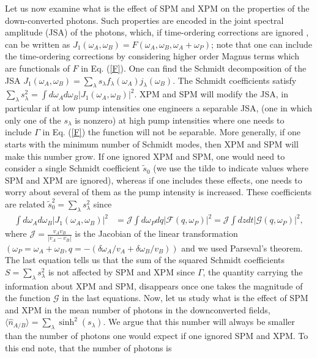 \documentclass[letterpaper,10pt]{article}
\newcommand{\braket}[1]{\langle #1 \rangle}
\newcommand{\eq}[1]{\begin{align}#1\end{align}}
\begin{document}
Let us now examine what is the effect of SPM and XPM on the properties of the down-converted photons. Such properties are encoded in the joint spectral amplitude (JSA) of the photons, which, if time-ordering corrections are ignored \cite{nico1}, can be written as $J_1(\omega_A,\omega_B)=F(\omega_A,\omega_B,\omega_A+\omega_P)$; note that one can include the time-ordering corrections by considering higher order Magnus terms \cite{nico2} which are functionals of $F$ in Eq. (\ref{F}).
One can find the Schmidt decomposition of the JSA $J_1(\omega_A,\omega_B)=\sum_\lambda s_\lambda f_\lambda (\omega_A) j_\lambda(\omega_B)$. 
The Schmidt coefficients satisfy $\sum_\lambda s_\lambda^2=\int d \omega_A d\omega_B |J_1(\omega_A,\omega_B)|^2$. 
XPM and SPM will modify the JSA, in particular if at low pump intensities one engineers a separable JSA, (one in which only one of the $s_\lambda$ is nonzero) at high pump intensities where one needs to include $\Gamma$ in Eq. (\ref{F}) the function will not be separable.  
More generally, if one starts with the minimum number of Schmidt modes, then XPM and SPM will make this number grow. If one ignored XPM and SPM, one would need to consider a single Schmidt coefficient $\tilde s_0$ (we use the tilde to indicate values where SPM and XPM are ignored), whereas if one includes these effects, one needs to worry about several of them as the pump intensity is increased. These coefficients are related $\tilde s_0^2=\sum_{\lambda} s_\lambda^2$ since 
\eq{
\int d \omega_A d\omega_B |J_1(\omega_A,\omega_B)|^2&= \mathcal{J} \int d \omega_P dq |\mathcal{F}(q,\omega_P)|^2 = \mathcal{J}  \int dz dt|\mathcal{G}(q,\omega_P)|^2,
}
where $\mathcal{J}=\frac{v_A v_B}{|v_A-v_B|}$ is the Jacobian of the linear transformation $(\omega_P=\omega_A+\omega_B,q=-(\delta \omega_A/v_A+\delta \omega_B/v_B))$ and we used Parseval's theorem.
The last equation tells us that the sum of the squared Schmidt coefficients $S=\sum_{\lambda} s_\lambda^2$ is not affected by SPM and XPM since $\Gamma$, the quantity carrying the information about XPM and SPM, disappears once one takes the magnitude of the function $\mathcal{G}$ in the last equations.
Now, let us study what is the effect of SPM and XPM in the mean number of photons in the downconverted fields, $\braket{\hat n_{A/B}}=\sum_\lambda \sinh^2 (s_\lambda )$. We argue that this number will always be smaller than the number of photons one would expect if one ignored SPM and XPM. 
To this end note, that the number of photons is
\end{document}

